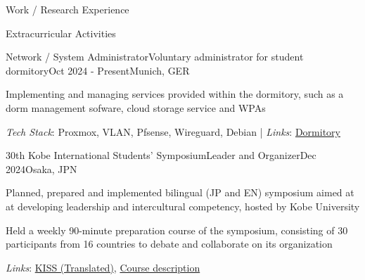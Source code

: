 \documentclass{kyvernitis-resume}
\begin{document}
\begin{section}{Work / Research Experience}
    

  
\end{section}
\begin{section}{Extracurricular Activities}

     \begin{subsection}{Network / System Administrator}{Voluntary administrator for student dormitory}{Oct 2024 - Present}{Munich, GER}
     \item{Implementing and managing services provided within the dormitory, such as a dorm management sofware, cloud storage service and WPAs}
     \end{subsection}
    \textit{Tech Stack}: Proxmox, VLAN, Pfsense, Wireguard, Debian\hspace{0.1cm} | \hspace{0.1cm}
    \textit{Links}: \href{https://www.schollheim.net/}{Dormitory}
    



         \begin{subsection}{30th Kobe International Students' Symposium}{Leader and Organizer}{Dec 2024}{Osaka, JPN}
         \item{Planned, prepared and implemented bilingual (JP and EN) symposium aimed at at developing leadership and intercultural competency, hosted by Kobe University}
         \item{Held a weekly 90-minute preparation course of the symposium, consisting of 30 participants from 16 countries to debate and collaborate on its organization}
        \end{subsection}
        \textit{Links}: \href{https://www-kobe--u-ac-jp.translate.goog/ja/announcement/20250106-66392/?_x_tr_sl=auto&_x_tr_tl=en&_x_tr_hl=en&_x_tr_pto=wapp}{KISS (Translated)}, \href{https://kym22-web.ofc.kobe-u.ac.jp/kobe_e_syllabus/2024/20/data/2024_3U084.html}{Course description}
    


\end{section}
\end{document}
